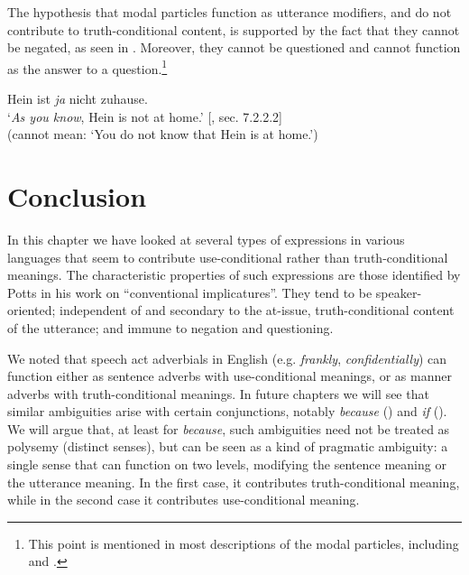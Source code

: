 The hypothesis that  modal particles function as utterance modifiers, and do not contribute to truth-conditional content, is supported by the fact that they cannot be negated, as seen in . Moreover, they cannot be questioned and cannot function as the answer to a question.\footnote{This point is mentioned in most descriptions of the  modal particles, including \citet{Bross2012} and \citet{Gutzmann2015}.}


\ea \label{ex:11.28}
Hein ist \textit{ja} nicht zuhause.\\
\glt ‘\textit{As you know}, Hein is not at home.’  [\citealt{Gutzmann2015}, sec. 7.2.2.2]\\
(cannot mean: ‘You do not know that Hein is at home.’)
\z

\section{Conclusion}\label{sec:11.7}

In this chapter we have looked at several types of expressions in various languages that seem to contribute use-conditional rather than truth-conditional meanings. The characteristic properties of such expressions are those identified by Potts in his work on “conventional implicatures”. They tend to be speaker-oriented; independent of and secondary to the at-issue, truth-conditional content of the utterance; and immune to negation and questioning.



We noted that speech act adverbials in English (e.g. \textit{frankly}, \textit{confidentially}) can function either as sentence adverbs with use-conditional meanings, or as manner adverbs with truth-conditional meanings. In future chapters we will see that similar ambiguities arise with certain conjunctions, notably \textit{because} () and \textit{if} (). We will argue that, at least for \textit{because}, such ambiguities need not be treated as polysemy (distinct senses), but can be seen as a kind of pragmatic ambiguity: a single sense that can function on two levels, modifying the sentence meaning or the utterance meaning. In the first case, it contributes truth-conditional meaning, while in the second case it contributes use-conditional meaning.



 
